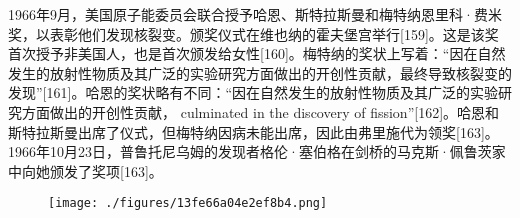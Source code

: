 1966年9月，美国原子能委员会联合授予哈恩、斯特拉斯曼和梅特纳恩里科·费米奖，以表彰他们发现核裂变。颁奖仪式在维也纳的霍夫堡宫举行[159]。这是该奖首次授予非美国人，也是首次颁发给女性[160]。梅特纳的奖状上写着：“因在自然发生的放射性物质及其广泛的实验研究方面做出的开创性贡献，最终导致核裂变的发现”[161]。哈恩的奖状略有不同：“因在自然发生的放射性物质及其广泛的实验研究方面做出的开创性贡献， culminated in the discovery of fission”[162]。哈恩和斯特拉斯曼出席了仪式，但梅特纳因病未能出席，因此由弗里施代为领奖[163]。1966年10月23日，普鲁托尼乌姆的发现者格伦·塞伯格在剑桥的马克斯·佩鲁茨家中向她颁发了奖项[163]。
\begin{figure}[ht]
\centering
\texttt{[image: ./figures/13fe66a04e2ef8b4.png]}
\caption{} \label{fig_LZm_17}
\end{figure}
